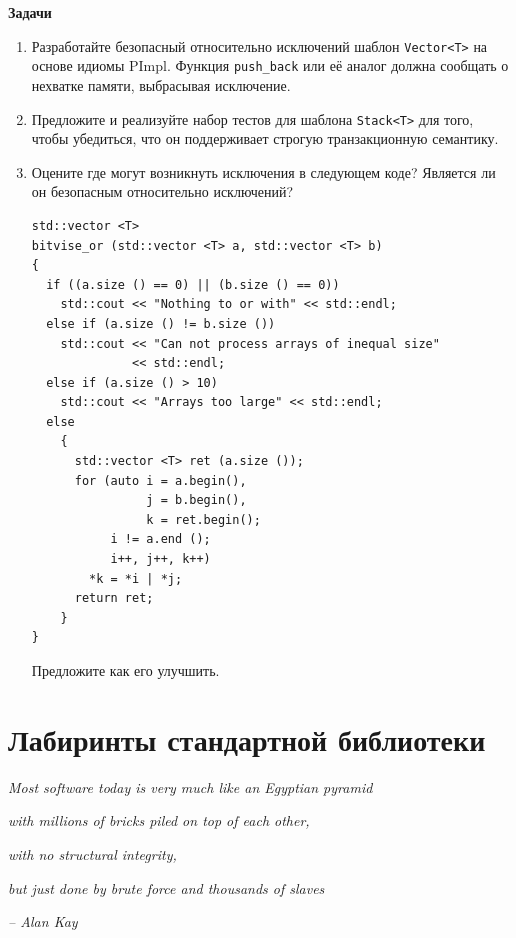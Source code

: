 \documentclass[a4paper,12pt,oneside]{article}
\begin{document}
\textbf{Задачи}

\begin{enumerate}

\item Разработайте безопасный относительно исключений шаблон \lstinline!Vector<T>! на основе идиомы PImpl. Функция \lstinline!push_back! или её аналог должна сообщать о нехватке памяти, выбрасывая исключение.

\item Предложите и реализуйте набор тестов для шаблона \lstinline!Stack<T>! для того, чтобы убедиться, что он поддерживает строгую транзакционную семантику.

\item Оцените где могут возникнуть исключения в следующем коде? Является ли он безопасным относительно исключений?

\begin{lstlisting}
std::vector <T>
bitvise_or (std::vector <T> a, std::vector <T> b)
{
  if ((a.size () == 0) || (b.size () == 0))
    std::cout << "Nothing to or with" << std::endl;
  else if (a.size () != b.size ())
    std::cout << "Can not process arrays of inequal size" 
              << std::endl;
  else if (a.size () > 10)
    std::cout << "Arrays too large" << std::endl;
  else
    {
      std::vector <T> ret (a.size ());
      for (auto i = a.begin(), 
                j = b.begin(), 
                k = ret.begin();
           i != a.end (); 
           i++, j++, k++)
        *k = *i | *j;
      return ret;
    }
}
\end{lstlisting}

Предложите как его улучшить.

\end{enumerate}

\pagebreak
\section{Лабиринты стандартной библиотеки}

\hfill\textit{Most software today is very much like an Egyptian pyramid}

\hfill\textit{with millions of bricks piled on top of each other,}

\hfill\textit{with no structural integrity,}

\hfill\textit{but just done by brute force and thousands of slaves}{\vspace{0.5em}}

\hfill\textit{-- Alan Kay}
\end{document}
